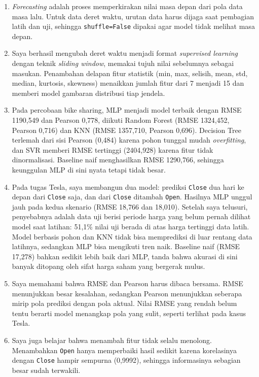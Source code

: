 \documentclass[a4paper,oneside,12pt]{report}
\begin{document}
\begin{enumerate}
    \item \textit{Forecasting} adalah proses memperkirakan nilai masa depan dari pola data masa lalu. Untuk data deret waktu, urutan data harus dijaga saat pembagian latih dan uji, sehingga \texttt{shuffle=False} dipakai agar model tidak melihat masa depan.
    \item Saya berhasil mengubah deret waktu menjadi format \textit{supervised learning} dengan teknik \textit{sliding window}, memakai tujuh nilai sebelumnya sebagai masukan. Penambahan delapan fitur statistik (min, max, selisih, mean, std, median, kurtosis, skewness) menaikkan jumlah fitur dari 7 menjadi 15 dan memberi model gambaran distribusi tiap jendela.
    \item Pada percobaan bike sharing, MLP menjadi model terbaik dengan RMSE 1190,549 dan Pearson 0,778, diikuti Random Forest (RMSE 1324,452, Pearson 0,716) dan KNN (RMSE 1357,710, Pearson 0,696). Decision Tree terlemah dari sisi Pearson (0,484) karena pohon tunggal mudah \textit{overfitting}, dan SVR memberi RMSE tertinggi (2404,928) karena fitur tidak dinormalisasi. Baseline naif menghasilkan RMSE 1290,766, sehingga keunggulan MLP di sini nyata tetapi tidak besar.
    \item Pada tugas Tesla, saya membangun dua model: prediksi \texttt{Close} dua hari ke depan dari \texttt{Close} saja, dan dari \texttt{Close} ditambah \texttt{Open}. Hasilnya MLP unggul jauh pada kedua skenario (RMSE 18,766 dan 18,010). Setelah saya telusuri, penyebabnya adalah data uji berisi periode harga yang belum pernah dilihat model saat latihan: 51,1\% nilai uji berada di atas harga tertinggi data latih. Model berbasis pohon dan KNN tidak bisa memprediksi di luar rentang data latihnya, sedangkan MLP bisa mengikuti tren naik. Baseline naif (RMSE 17,278) bahkan sedikit lebih baik dari MLP, tanda bahwa akurasi di sini banyak ditopang oleh sifat harga saham yang bergerak mulus.
    \item Saya memahami bahwa RMSE dan Pearson harus dibaca bersama. RMSE menunjukkan besar kesalahan, sedangkan Pearson menunjukkan seberapa mirip pola prediksi dengan pola aktual. Nilai RMSE yang rendah belum tentu berarti model menangkap pola yang sulit, seperti terlihat pada kasus Tesla.
    \item Saya juga belajar bahwa menambah fitur tidak selalu menolong. Menambahkan \texttt{Open} hanya memperbaiki hasil sedikit karena korelasinya dengan \texttt{Close} hampir sempurna (0,9992), sehingga informasinya sebagian besar sudah terwakili.
\end{enumerate}
\end{document}
